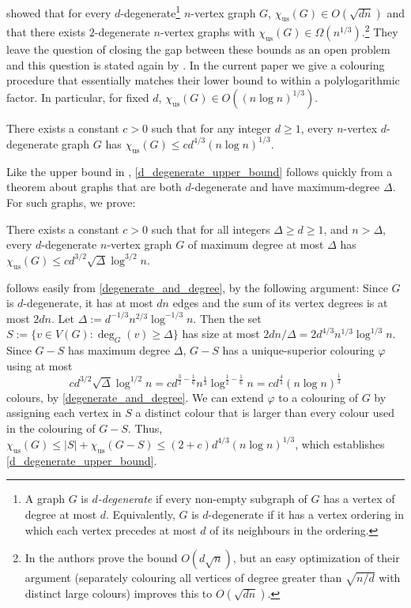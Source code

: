 \documentclass{patmorin}
\newcommand{\defin}[1]{\emph{\color{brightmaroon}#1}}
\newcommand{\trn}{\chi_{\mathrm{us}}}
\begin{document}
\citet{karpas.neiman.ea:on}  showed that for every $d$-degenerate\footnote{A graph $G$ is \defin{$d$-degenerate} if every non-empty subgraph of $G$ has a vertex of degree at most $d$.  Equivalently, $G$ is $d$-degenerate if it has a vertex ordering in which each vertex precedes at most $d$ of its neighbours in the ordering.} $n$-vertex graph $G$, $\trn(G)\in O(\sqrt{dn})$ and that there exists $2$-degenerate $n$-vertex graphs with $\trn(G)\in\Omega(n^{1/3})$.\footnote{In \cite[Theorem~6.2]{karpas.neiman.ea:on} the authors prove the bound $O(d\sqrt{n})$, but an easy optimization of their argument (separately colouring all vertices of degree greater than $\sqrt{n/d}$ with distinct large colours) improves this to $O(\sqrt{dn})$.}  They leave the question of closing the gap between these bounds as an open problem and this question is stated again by \citet{bose.dujmovic.ea:asymptotically}.
In the current paper we give a colouring procedure that essentially matches their lower bound to within a polylogarithmic factor.  In particular, for fixed $d$, $\trn(G)\in O((n\log n)^{1/3})$.

\begin{thm}\label{d_degenerate_upper_bound}
  There exists a constant $c>0$ such that for any integer $d\ge 1$, every $n$-vertex $d$-degenerate graph $G$ has $\trn(G) \le c d^{4/3}(n\log n)^{1/3}$.
\end{thm}

Like the upper bound in \cite{karpas.neiman.ea:on}, \cref{d_degenerate_upper_bound} follows quickly from a theorem about graphs that are both $d$-degenerate and have maximum-degree $\Delta$. For such graphs, we prove:

\begin{thm}\label{degenerate_and_degree}
  There exists a constant $c>0$ such that
  for all integers $\Delta\ge d \ge 1$, and $n> \Delta$, every $d$-degenerate $n$-vertex graph $G$ of maximum degree at most $\Delta$ has
  $\trn(G)\leq cd^{3/2}\sqrt{\Delta}\log^{3/2} n$.
\end{thm}

 follows easily from \cref{degenerate_and_degree}, by the following argument:  Since $G$ is $d$-degenerate, it has at most $dn$ edges and the sum of its vertex degrees is at most $2dn$.  Let $\Delta:=d^{-1/3}n^{2/3}\log^{-1/3} n$.  Then the set $S:=\{v\in V(G):\deg_G(v)\ge \Delta\}$ has size at most $2dn/\Delta=2d^{4/3}n^{1/3}\log^{1/3} n$.  Since $G-S$ has maximum degree $\Delta$, $G-S$ has a unique-superior colouring $\varphi$ using at most
\[
  cd^{3/2}\sqrt{\Delta}\log^{1/2} n
  = c d^{\tfrac{3}{2}-\tfrac{1}{6}}n^{\tfrac{1}{3}}\log^{\tfrac{1}{2}-\tfrac{1}{6}} n
  = c d^{\tfrac{4}{3}}(n\log n)^{\tfrac{1}{3}}
\]
colours, by \cref{degenerate_and_degree}. We can extend $\varphi$ to a colouring of $G$ by assigning each vertex in $S$ a distinct colour that is larger than every colour used in the colouring of $G-S$.  Thus, $\trn(G)\le |S|+\trn(G-S)\le (2+c)d^{4/3}(n\log n)^{1/3}$, which establishes \cref{d_degenerate_upper_bound}.
\end{document}
